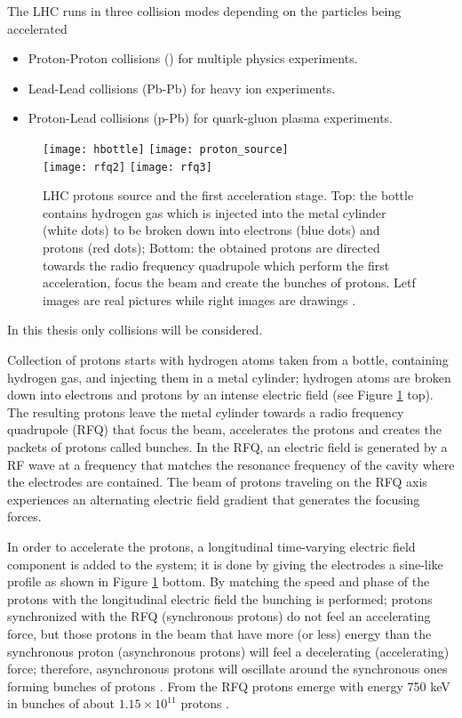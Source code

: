 The LHC runs in three collision modes depending on the particles being accelerated

\begin{itemize}
\item Proton-Proton collisions (\pp) for multiple physics experiments.
\item Lead-Lead collisions (Pb-Pb) for heavy ion experiments. 
\item Proton-Lead collisions (p-Pb) for quark-gluon plasma experiments.
\end{itemize}

\begin{figure}[!h]
\centering
\texttt{[image: hbottle]}
\texttt{[image: proton\_source]}\\
\texttt{[image: rfq2]}
\texttt{[image: rfq3]}
\caption[LHC protons source. First acceleration stage.]{LHC protons source and the first acceleration stage. Top: the bottle contains hydrogen gas which is injected into the metal cylinder (white dots) to be broken down into electrons (blue dots) and protons (red dots); Bottom: the obtained protons are directed towards the radio frequency quadrupole which perform the first acceleration, focus the beam and create the bunches of protons. Letf images are real pictures while right images are drawings \cite{rfq2,video}.}\label{fig:hbottle}
\end{figure}

\noindent In this thesis only \pp collisions will be considered.

Collection of protons starts with hydrogen atoms taken from a bottle, containing hydrogen gas, and injecting them in a metal cylinder; hydrogen atoms are broken down into electrons and protons by an intense electric field (see Figure \ref{fig:hbottle} top). The resulting protons leave the metal cylinder towards a radio frequency quadrupole (RFQ) that focus the beam, accelerates the protons and creates the packets of protons called bunches. In the RFQ, an electric field is generated by a RF wave at a frequency that matches the resonance frequency of the cavity where the electrodes are contained. The beam of protons traveling on the RFQ axis experiences an alternating electric field gradient that generates the focusing forces.

In order to accelerate the protons, a longitudinal time-varying electric field component is added to the system; it is done by giving the electrodes a sine-like profile as shown in Figure \ref{fig:hbottle} bottom. By matching the speed and phase of the protons with the longitudinal electric field the bunching is performed; protons synchronized with the RFQ (synchronous protons) do not feel an accelerating force, but those protons in the beam that have more (or less) energy than the synchronous proton (asynchronous protons) will feel a decelerating (accelerating) force; therefore, asynchronous protons will oscillate around the synchronous ones forming bunches of protons \cite{rfq}. From the RFQ protons emerge with energy 750 keV in bunches of about $1.15 \times 10^{11}$ protons \cite{lyndon}.        

